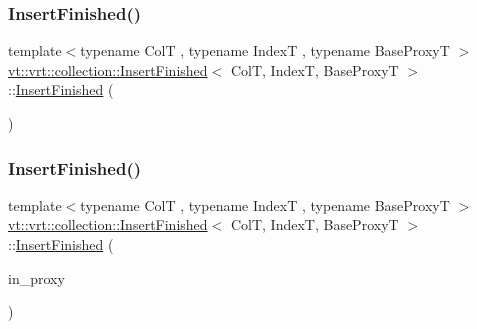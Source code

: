 \mbox{\label{structvt_1_1vrt_1_1collection_1_1_insert_finished_a0a0bbd5092ce0ee4cc59903e002688d0}} 
\subsubsection{\texorpdfstring{Insert\+Finished()}{InsertFinished()}\hspace{0.1cm}{\footnotesize\ttfamily [3/4]}}
{\footnotesize\ttfamily template$<$typename ColT , typename IndexT , typename Base\+ProxyT $>$ \\
\hyperlink{structvt_1_1vrt_1_1collection_1_1_insert_finished}{vt\+::vrt\+::collection\+::\+Insert\+Finished}$<$ ColT, IndexT, Base\+ProxyT $>$\+::\hyperlink{structvt_1_1vrt_1_1collection_1_1_insert_finished}{Insert\+Finished} (\begin{DoxyParamCaption}\item[{\hyperlink{structvt_1_1vrt_1_1collection_1_1_insert_finished}{Insert\+Finished}$<$ ColT, IndexT, Base\+ProxyT $>$ \&\&}]{ }\end{DoxyParamCaption})\hspace{0.3cm}{\ttfamily [default]}}

\mbox{\label{structvt_1_1vrt_1_1collection_1_1_insert_finished_a55fa81f0804add512dc47cdaa5e6b7db}} 
\subsubsection{\texorpdfstring{Insert\+Finished()}{InsertFinished()}\hspace{0.1cm}{\footnotesize\ttfamily [4/4]}}
{\footnotesize\ttfamily template$<$typename ColT , typename IndexT , typename Base\+ProxyT $>$ \\
\hyperlink{structvt_1_1vrt_1_1collection_1_1_insert_finished}{vt\+::vrt\+::collection\+::\+Insert\+Finished}$<$ ColT, IndexT, Base\+ProxyT $>$\+::\hyperlink{structvt_1_1vrt_1_1collection_1_1_insert_finished}{Insert\+Finished} (\begin{DoxyParamCaption}\item[{\hyperlink{namespacevt_a1b417dd5d684f045bb58a0ede70045ac}{Virtual\+Proxy\+Type} const}]{in\+\_\+proxy }\end{DoxyParamCaption})\hspace{0.3cm}{\ttfamily [explicit]}}



